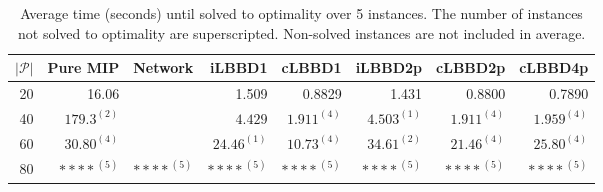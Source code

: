 \begin{table*}
    \centering
    \caption{Average time (seconds) until solved to optimality over 5 instances. The number of instances not solved to optimality are superscripted. Non-solved instances are not included in average.}
    \begin{tabular}{rrrrrrrr} \toprule
        $|\mathcal{P}|$ & Pure MIP & Network & iLBBD1 & cLBBD1 & iLBBD2p & cLBBD2p & cLBBD4p \\ \midrule
        20              & 16.06 &         & 1.509 &  0.8829 & 1.431 & 0.8800 & 0.7890 \\
        40              & $179.3^{(2)}$ &    &  $4.429$ & $1.911^{(4)}$ & $4.503^{(1)}$ & $1.911^{(4)}$ & $1.959^{(4)}$ \\
        60 & $30.80^{(4)}$ &  & $24.46^{(1)}$ & $10.73^{(4)}$ & $34.61^{(2)}$ & $21.46^{(4)}$ & $25.80^{(4)}$ \\
        80 & ${****}^{(5)}$ & ${****}^{(5)}$ & ${****}^{(5)}$ & ${****}^{(5)}$ & ${****}^{(5)}$ & ${****}^{(5)}$ & ${****}^{(5)}$ \\
        \bottomrule
    \end{tabular}
\end{table*}
